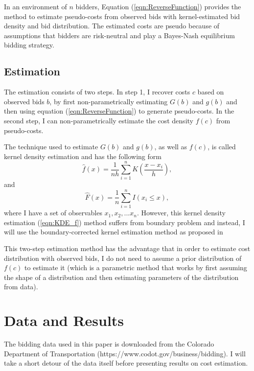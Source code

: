 \documentclass[11pt]{article}
\begin{document}
In an environment of $n$ bidders, Equation (\ref{eqn:ReverseFunction}) provides 
the method to estimate pseudo-costs from observed bids with kernel-estimated 
bid density and bid distribution. The estimated costs are pseudo because of  
assumptions that bidders are risk-neutral and play a Bayes-Nash equilibrium bidding 
strategy. 

\subsection{Estimation}
The estimation consists of two steps. In step 1, I recover costs $c$ based on 
observed bids $b$, by first non-parametrically estimating $G(b)$ and $g(b)$ 
and then using equation (\ref{eqn:ReverseFunction}) to 
generate pseudo-costs. In the second step, I can non-parametrically estimate the cost
density $f(c)$ from pseudo-costs. 

The technique used to estimate $G(b)$ and $g(b)$, as well as $f(c)$, is called 
kernel density estimation and has the following form
\begin{equation}
    \hat{f}(x) = \frac{1}{nh}\sum_{i=1}^n K(\frac{x-x_i}{h}),
    \label{eqn:KDE_f}
\end{equation}
and 
\begin{equation}
    \hat{F}(x) = \frac{1}{n}\sum_{i=1}^n I(x_i \leq x), 
    \label{eqn:KDE_F}
\end{equation}
where I have a set of observables ${x_1, x_2, ... x_n}$. However, this  
kernel density estimation (\ref{eqn:KDE_f}) 
method suffers from boundary 
problem and instead, I will use the boundary-corrected kernel estimation 
method as proposed in \cite{HickmanHubbard2015}

This two-step estimation method has the advantage that in order to estimate cost 
distribution with observed bids, I do not need to assume a prior distribution 
of $f(c)$ to estimate it (which is a parametric method that works by 
first assuming the shape of a distribution and then estimating parameters of the 
distribution from data). 


\section{Data and Results}
The bidding data used in this paper is downloaded from the Colorado Department of 
Transportation (https://www.codot.gov/business/bidding). I will take a short detour of the data itself before 
presenting results on cost estimation. 
\end{document}
